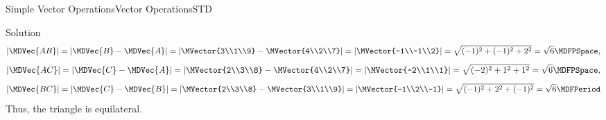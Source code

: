 \begin{MXContent}{Simple Vector Operations}{Vector Operations}{STD}
\begin{MHint}{Solution}
\[
 |\MDVec{A B}| = |\MDVec{B}-\MDVec{A}|=\left|\MVector{3\\1\\9}-\MVector{4\\2\\7}\right|=\left|\MVector{-1\\-1\\2}\right|=\sqrt{(-1)^2+(-1)^2+2^2}=\sqrt{6} \MDFPSpace,
\]
\[
 |\MDVec{A C}| = |\MDVec{C}-\MDVec{A}|=\left|\MVector{2\\3\\8}-\MVector{4\\2\\7}\right|=\left|\MVector{-2\\1\\1}\right|=\sqrt{(-2)^2+1^2+1^2}=\sqrt{6} \MDFPSpace,
\]
\[
 |\MDVec{B C}| = |\MDVec{C}-\MDVec{B}|=\left|\MVector{2\\3\\8}-\MVector{3\\1\\9}\right|=\left|\MVector{-1\\2\\-1}\right|=\sqrt{(-1)^2+2^2+(-1)^2}=\sqrt{6} \MDFPeriod
\]
Thus, the triangle is equilateral.
\end{MHint}
\end{MXContent}


